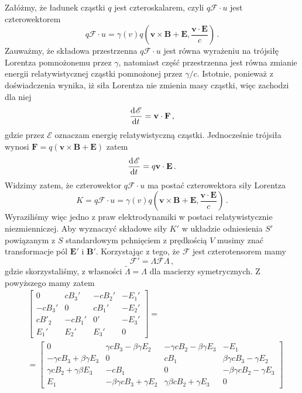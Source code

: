 \documentclass[../main.tex]{subfiles}
\begin{document}
Załóżmy, że ładunek cząstki \(q\) jest czteroskalarem, czyli \(q\mathscr{F}\cdot u\) jest czterowektorem
\begin{equation*}
    q\mathscr{F}\cdot u=\gamma(v)q\left(\mathbf{v}\times\mathbf{B}+\mathbf{E},\frac{\mathbf{v}\cdot\mathbf{E}}{c}\right)\,.
\end{equation*}
Zauważmy, że składowa przestrzenna \(q\mathscr{F}\cdot u\) jest równa wyrażeniu na trójsiłę Lorentza pomnożonemu przez \(\gamma\), natomiast część przestrzenna jest równa zmianie energii relatywistycznej cząstki pomnożonej przez \(\gamma/c\). Istotnie, ponieważ z doświadczenia wynika, iż siła Lorentza nie zmienia masy cząstki, więc zachodzi dla niej
\begin{equation*}
    \dv[]{\mathscr{E}}{t}=\mathbf{v}\cdot\mathbf{F}\,,
\end{equation*}
gdzie przez \(\mathscr{E}\) oznaczam energię relatywistyczną cząstki. Jednocześnie trójsiła wynosi \(\mathbf{F}=q(\mathbf{v}\times\mathbf{B}+\mathbf{E})\) zatem
\begin{equation*}
    \dv[]{\mathscr{E}}{t}=q\mathbf{v}\cdot\mathbf{E}\,.
\end{equation*}
Widzimy zatem, że czterowektor \(q\mathscr{F}\cdot u\) ma postać czterowektora siły Lorentza
\begin{equation*}
    K=q\mathscr{F}\cdot u=\gamma(v)q\left(\mathbf{v}\times\mathbf{B}+\mathbf{E},\frac{\mathbf{v}\cdot\mathbf{E}}{c}\right)\,.
\end{equation*}
Wyraziliśmy więc jedno z praw elektrodynamiki w postaci relatywistycznie niezmienniczej. Aby wyznaczyć składowe siły \(K'\) w układzie odniesienia \(S'\) powiązanym z \(S\) standardowym pchnięciem z prędkością \(V\) musimy znać transformacje pól \(\mathbf{E}'\) i \(\mathbf{B}'\). Korzystając z tego, że \(\mathscr{F}\) jest czterotensorem mamy
\begin{equation*}
    \mathscr{F}'=\Lambda\mathscr{F}\Lambda\,,
\end{equation*}
gdzie skorzystaliśmy, z własności \(\tilde{\Lambda}=\Lambda\) dla macierzy symetrycznych. Z powyższego mamy zatem
\begin{equation*}
\begin{split}
   & \left[\begin{array}{cccc}
         0&cB_3'&-cB_2'&-E_1'  \\
         -cB_3'&0&cB_1'&-E_2'  \\
         cB'_2&-cB_1'&0'&-E_3'  \\
         E_1'&E_2'&E_3'&0  
    \end{array}\right]=\\
    &=\left[\begin{array}{cccc}
         0&\gamma cB_3-\beta\gamma E_2&-\gamma cB_2-\beta\gamma E_3&-E_1 \\
         -\gamma cB_3+\beta\gamma E_3&0&cB_1&\beta\gamma cB_3-\gamma E_2\\
         \gamma cB_2+\gamma\beta E_3&-cB_1&0&-\beta\gamma cB_2-\gamma E_3\\
         E_1&-\beta\gamma cB_3+\gamma E_2&\gamma\beta cB_2+\gamma E_3&0
    \end{array}\right]
\end{split}
\end{equation*}
\end{document}
